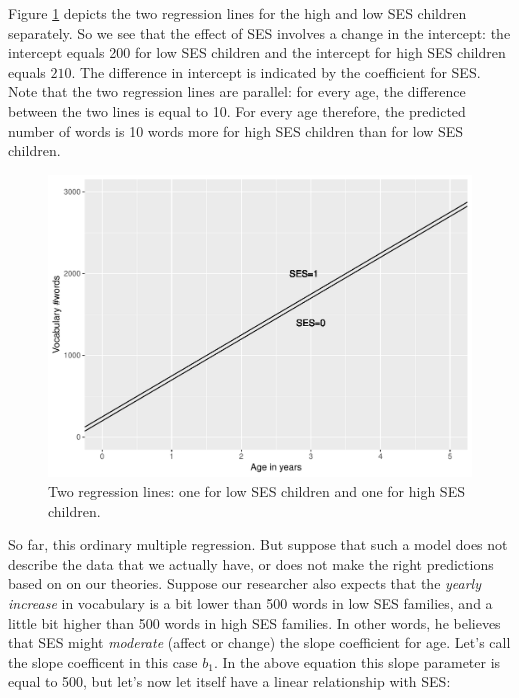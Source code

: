 \documentclass[]{book}\usepackage[]{graphicx}\usepackage[]{color}
\makeatletter
\def\maxwidth{ %
  \ifdim\Gin@nat@width>\linewidth
    \linewidth
  \else
    \Gin@nat@width
  \fi
}
\newenvironment{knitrout}{}{} %
\makeatother
\begin{document}
Figure \ref{fig:summary_plot0} depicts the two regression lines for the high and low SES children separately. So we see that the effect of SES involves a change in the intercept: the intercept equals 200 for low SES children and the intercept for high SES children equals $210$. The difference in intercept is indicated by the coefficient for SES. Note that the two regression lines are parallel: for every age, the difference between the two lines is equal to 10. For every age therefore, the predicted number of words is 10 words more for high SES children than for low SES children.


\begin{knitrout}
\color{fgcolor}\begin{figure}
\includegraphics[width=\maxwidth]{figure/summary_plot0-1} \caption[Two regression lines]{Two regression lines: one for low SES children and one for high SES children.}\label{fig:summary_plot0}
\end{figure}


\end{knitrout}

So far, this ordinary multiple regression. But suppose that such a model does not describe the data that we actually have, or does not make the right predictions based on on our theories. Suppose our researcher also expects that the \textit{yearly increase} in vocabulary is a bit lower than 500 words in low SES families, and a little bit higher than 500 words in high SES families. In other words, he believes that SES might \textit{moderate} (affect or change) the slope coefficient for age. Let's call the slope coefficent in this case $b_1$. In the above equation this slope parameter is equal to 500, but let's now let itself have a linear relationship with SES:
\end{document}
